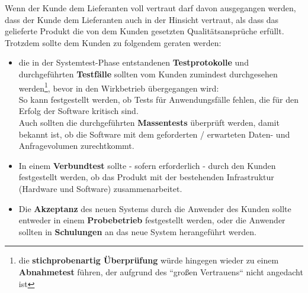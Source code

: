 
Wenn der Kunde dem Lieferanten voll vertraut darf davon ausgegangen werden, dass der Kunde dem Lieferanten auch in der Hinsicht vertraut, als dass das gelieferte Produkt die von dem Kunden gesetzten Qualitätsansprüche erfüllt.\\
Trotzdem sollte dem Kunden zu folgendem geraten werden:
\begin{itemize}
    \item die in der Systemtest-Phase entstandenen \textbf{Testprotokolle} und durchgeführten \textbf{Testfälle} sollten vom Kunden zumindest  durchgesehen werden\footnote{
        die \textbf{stichprobenartig Überprüfung} würde hingegen wieder zu einem \textbf{Abnahmetest} führen, der aufgrund des ``großen Vertrauens`` nicht angedacht ist
    }, bevor in den Wirkbetrieb übergegangen wird:\\
    So kann festgestellt werden, ob Tests für Anwendungsfälle fehlen, die für den Erfolg der Software kritisch sind.\\
    Auch sollten die durchgeführten \textbf{Massentests} überprüft werden, damit bekannt ist, ob die Software mit dem geforderten / erwarteten Daten- und Anfragevolumen zurechtkommt.
    \item In einem \textbf{Verbundtest} sollte - sofern erforderlich - durch den Kunden festgestellt werden, ob das Produkt mit der bestehenden Infrastruktur (Hardware und Software) zusammenarbeitet.
    \item Die \textbf{Akzeptanz} des neuen Systems durch die Anwender des Kunden sollte entweder in einem \textbf{Probebetrieb} festgestellt werden, oder die Anwender sollten in \textbf{Schulungen} an das neue System herangeführt werden.
\end{itemize}